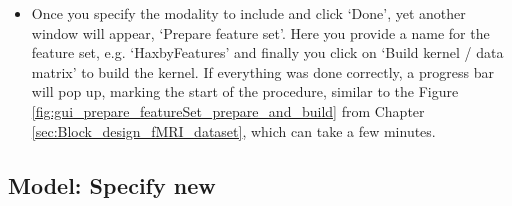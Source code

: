 \begin{itemize}
\begin{itemize}
		
	\end{itemize}		
		
		\item Once you specify the modality to include and click `Done', yet another window will appear, `Prepare feature set'. Here you provide a name for the feature set, e.g. `HaxbyFeatures' and finally you click on `Build kernel / data matrix' to build the kernel. If everything was done correctly, a progress bar will pop up, marking the start of the procedure, similar to the Figure \ref{fig:gui_prepare_featureSet_prepare_and_build} from Chapter \ref{sec:Block_design_fMRI_dataset}, which can take a few minutes.

\end{itemize}



\subsection{Model: Specify new}

